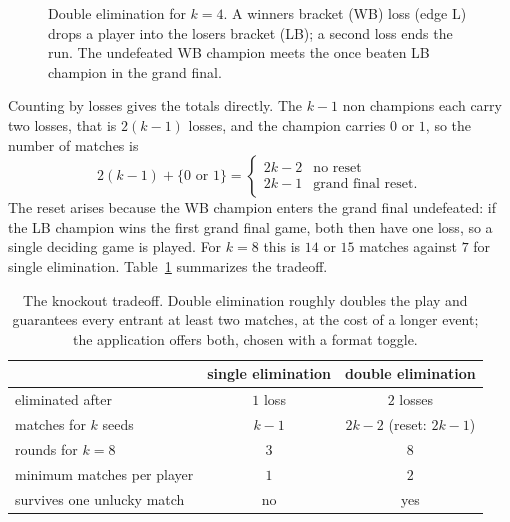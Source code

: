 \documentclass[11pt]{article}
\begin{document}
\begin{figure}[h]
\centering
{}
\caption{Double elimination for $k=4$. A winners bracket (WB) loss (edge L) drops a
player into the losers bracket (LB); a second loss ends the run. The undefeated WB
champion meets the once beaten LB champion in the grand final.}
\label{fig:de}
\end{figure}

Counting by losses gives the totals directly. The $k-1$ non champions each carry two
losses, that is $2(k-1)$ losses, and the champion carries $0$ or $1$, so the number
of matches is
\[
2(k-1) + \{0 \text{ or } 1\} = \begin{cases} 2k-2 & \text{no reset}\\ 2k-1 & \text{grand final reset.}\end{cases}
\]
The reset arises because the WB champion enters the grand final undefeated: if the
LB champion wins the first grand final game, both then have one loss, so a single
deciding game is played. For $k=8$ this is $14$ or $15$ matches against $7$ for
single elimination. Table~\ref{tab:formats} summarizes the tradeoff.

\begin{table}[h]
\centering
\begin{tabular}{lcc}
\toprule
 & single elimination & double elimination \\
\midrule
eliminated after & $1$ loss & $2$ losses \\
matches for $k$ seeds & $k-1$ & $2k-2$ (reset: $2k-1$) \\
rounds for $k=8$ & $3$ & $8$ \\
minimum matches per player & $1$ & $2$ \\
survives one unlucky match & no & yes \\
\bottomrule
\end{tabular}
\caption{The knockout tradeoff. Double elimination roughly doubles the play and
guarantees every entrant at least two matches, at the cost of a longer event; the
application offers both, chosen with a format toggle.}
\label{tab:formats}
\end{table}
\end{document}
